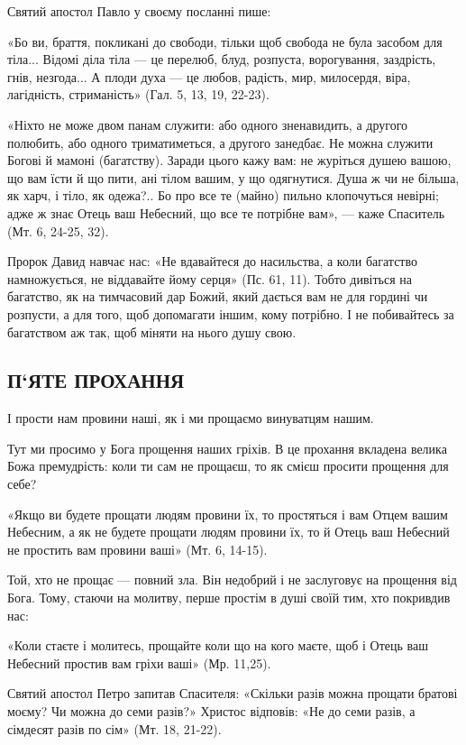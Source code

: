 \documentclass[main.tex]{subfiles}
\begin{document}
Святий апостол Павло у своєму посланні пише:

«Бо ви, браття, покликані до свободи, тільки щоб свобода не була засобом для тіла... Відомі діла тіла — це перелюб, блуд, розпуста, ворогування, заздрість, гнів, незгода... А плоди духа — це любов, радість, мир, милосердя, віра, лагідність, стриманість» (Гал. 5, 13, 19, 22-23).

«Ніхто не може двом панам служити: або одного зненавидить, а другого полюбить, або одного триматиметься, а другого занедбає. Не можна служити Богові й мамоні (багатству). Заради цього кажу вам: не журіться душею вашою, що вам їсти й що пити, ані тілом вашим, у що одягнутися. Душа ж чи не більша, як харч, і тіло, як одежа?.. Бо про все те (майно) пильно клопочуться невірні; адже ж знає Отець ваш Небесний, що все те потрібне вам», — каже Спаситель (Мт. 6, 24-25, 32).

Пророк Давид навчає нас: «Не вдавайтеся до насильства, а коли багатство намножується, не віддавайте йому серця» (Пс. 61, 11). Тобто дивіться на багатство, як на тимчасовий дар Божий, який дається вам не для гордині чи розпусти, а для того, щоб допомагати іншим, кому потрібно. І не побивайтесь за багатством аж так, щоб міняти на нього душу свою.

\subsection{П`ЯТЕ ПРОХАННЯ}

І прости нам провини наші, як і ми прощаємо винуватцям нашим.

Тут ми просимо у Бога прощення наших гріхів. В це прохання вкладена велика Божа премудрість: коли ти сам не прощаєш, то як смієш просити прощення для себе?

«Якщо ви будете прощати людям провини їх, то простяться і вам Отцем вашим Небесним, а як не будете прощати людям провини їх, то й Отець ваш Небесний не простить вам провини ваші» (Мт. 6, 14-15).

Той, хто не прощає — повний зла. Він недобрий і не заслуговує на прощення від Бога. Тому, стаючи на молитву, перше простім в душі своїй тим, хто покривдив нас:

«Коли стаєте і молитесь, прощайте коли що на кого маєте, щоб і Отець ваш Небесний простив вам гріхи ваші» (Мр. 11,25).

Святий апостол Петро запитав Спасителя: «Скільки разів можна прощати братові моєму? Чи можна до семи разів?» Христос відповів: «Не до семи разів, а сімдесят разів по сім» (Мт. 18, 21-22).
\end{document}
